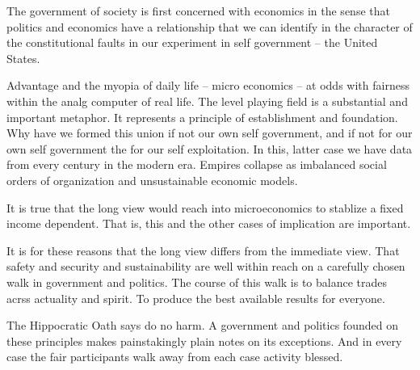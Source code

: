 

The government of society is first concerned with economics in the
sense that politics and economics have a relationship that we can
identify in the character of the constitutional faults in our
experiment in self government -- the United States.

Advantage and the myopia of daily life -- micro economics -- at odds
with fairness within the analg computer of real life.  The level
playing field is a substantial and important metaphor.  It represents
a principle of establishment and foundation.  Why have we formed this
union if not our own self government, and if not for our own self
government the for our self exploitation.  In this, latter case we
have data from every century in the modern era.  Empires collapse as
imbalanced social orders of organization and unsustainable economic
models.

It is true that the long view would reach into microeconomics to
stablize a fixed income dependent.  That is, this and the other cases
of implication are important.

It is for these reasons that the long view differs from the immediate
view.  That safety and security and sustainability are well within
reach on a carefully chosen walk in government and politics.  The
course of this walk is to balance trades acrss actuality and spirit.
To produce the best available results for everyone.

The Hippocratic Oath says do no harm.  A government and politics
founded on these principles makes painstakingly plain notes on its
exceptions.  And in every case the fair participants walk away from
each case activity blessed.

\bye
